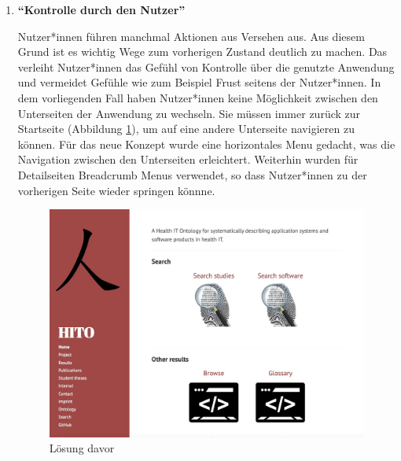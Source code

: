 \begin{enumerate}
\clearpage

\item \textbf{\enquote{Kontrolle durch den Nutzer}} \newline

Nutzer*innen führen manchmal Aktionen aus Versehen aus. 
Aus diesem Grund ist es wichtig Wege zum vorherigen Zustand deutlich zu machen.
Das verleiht Nutzer*innen das Gefühl von Kontrolle über die genutzte Anwendung und vermeidet Gefühle wie zum Beispiel Frust seitens der Nutzer*innen.
In dem vorliegenden Fall haben Nutzer*innen keine Möglichkeit zwischen den Unterseiten der Anwendung zu wechseln.
Sie müssen immer zurück zur Startseite (Abbildung \ref{fig:point3_davor}), um auf eine andere Unterseite navigieren zu können.
Für das neue Konzept wurde eine horizontales Menu gedacht, was die Navigation zwischen den Unterseiten erleichtert.
Weiterhin wurden für Detailseiten Breadcrumb Menus verwendet, so dass Nutzer*innen zu der vorherigen Seite wieder springen könnne.

\begin{figure}[H]
	\centering
    	\includegraphics[width=\textwidth]{Images/Punkt_3_davor}
   	\caption{Lösung davor}
   	\label{fig:point3_davor}
\end{figure}


\end{enumerate}
